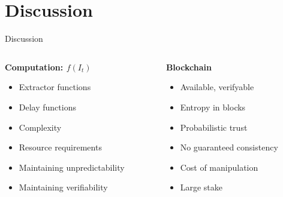 \section{Discussion}

\begin{frame}{Discussion}
    \begin{columns}
        \begin{column}{0.5\textwidth}
            \textbf{Computation: $f(I_t)$}
            \begin{itemize}
                \item Extractor functions
                \item Delay functions
                \item Complexity
                \item Resource requirements
                \item Maintaining unpredictability
                \item Maintaining verifiability
            \end{itemize}
        \end{column}
        \begin{column}{0.5\textwidth}
            \textbf{Blockchain}
            \begin{itemize}
                \item Available, verifyable
                \item Entropy in blocks
                \item Probabilistic trust
                \item No guaranteed consistency
                \item Cost of manipulation
                \item Large stake
            \end{itemize}
        \end{column}
    \end{columns}
\end{frame}
